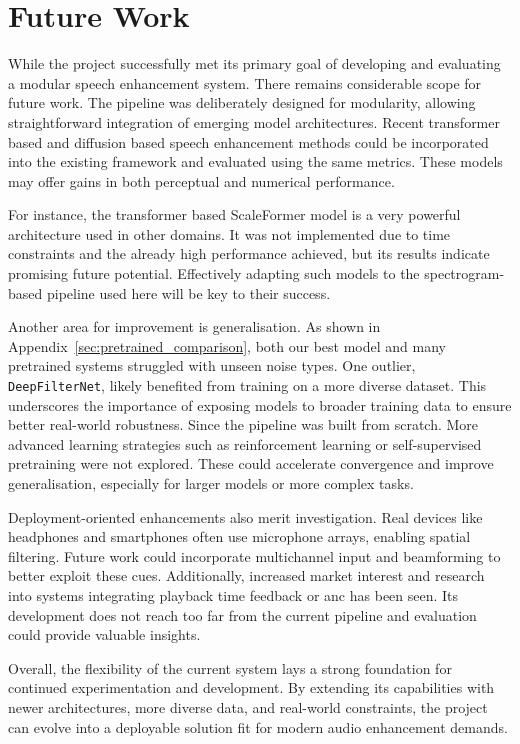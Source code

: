 \chapter{Future Work}
\label{chap:future_work}

While the project successfully met its primary goal of developing and evaluating a modular speech enhancement system. There remains considerable scope for future work. The pipeline was deliberately designed for modularity, allowing straightforward integration of emerging model architectures. Recent transformer based and diffusion based speech enhancement methods could be incorporated into the existing framework and evaluated using the same metrics. These models may offer gains in both perceptual and numerical performance.

For instance, the transformer based ScaleFormer model \cite{wu2023scaleformer}
is a very powerful architecture used in other domains. It was not implemented due to time constraints and the already high performance achieved, but its results indicate promising future potential. Effectively adapting such models to the spectrogram-based pipeline used here will be key to their success.

Another area for improvement is generalisation. As shown in Appendix~\ref{sec:pretrained_comparison}, both our best model and many pretrained systems struggled with unseen noise types. One outlier, \texttt{DeepFilterNet}, likely benefited from training on a more diverse dataset. This underscores the importance of exposing models to broader training data to ensure better real-world robustness. Since the pipeline was built from scratch. More advanced learning strategies such as reinforcement learning or self-supervised pretraining were not explored. These could accelerate convergence and improve generalisation, especially for larger models or more complex tasks.

Deployment-oriented enhancements also merit investigation. Real devices like headphones and smartphones often use microphone arrays, enabling spatial filtering. Future work could incorporate multichannel input and beamforming to better exploit these cues. Additionally, increased market interest and research into systems integrating playback time feedback or \gls{anc} has been seen. Its development does not reach too far from the current pipeline and evaluation could provide valuable insights.

Overall, the flexibility of the current system lays a strong foundation for continued experimentation and development. By extending its capabilities with newer architectures, more diverse data, and real-world constraints, the project can evolve into a deployable solution fit for modern audio enhancement demands.


